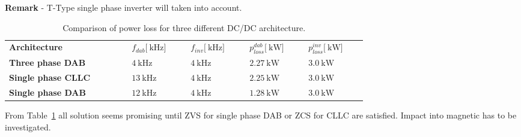 \documentclass[12pt,a4paper]{scrartcl}
\begin{document}
\begin{onehalfspace}
\noindent\textbf{Remark} - T-Type single phase inverter will taken into account.
\begin{center}	
	\doublespacing
	\begin{longtable}{p{0.25\linewidth}|p{0.125\linewidth}|p{0.125\linewidth}|p{0.125\linewidth}|p{0.125\linewidth}}
		\captionsetup{width=0.65\textwidth, font=small}
		\caption{Comparison of power loss for three different DC/DC architecture.}
		\label{summary_results_table_1} \\
		\hline\hline
		\textbf{Architecture} & \hspace*{\fill} $f_{dab}\big[\SI{}{\kilo\hertz}\big]$  & \hspace*{\fill} $f_{inv}\big[\SI{}{\kilo\hertz}\big]$ & \hspace*{\fill} $p_{loss}^{dab}\big[\SI{}{\kilo\watt}\big]$  & \hspace*{\fill} $p_{loss}^{inv}\big[\SI{}{\kilo\watt}\big]$ \\
		\hline
		\textbf{Three phase DAB} & \hspace*{\fill} $\SI{4}{\kilo\hertz}$ & \hspace*{\fill} $\SI{4}{\kilo\hertz}$  & \hspace*{\fill} $\SI{2.27 }{\kilo\watt}$  & \hspace*{\fill} $\SI{3.0}{\kilo\watt}$  \\
		\hline
		\textbf{Single phase CLLC} & \hspace*{\fill} $\SI{13}{\kilo\hertz}$  & \hspace*{\fill} $\SI{4}{\kilo\hertz}$ & \hspace*{\fill} $\SI{2.25}{\kilo\watt}$  & \hspace*{\fill} $\SI{3.0}{\kilo\watt}$  \\
		\hline
		\textbf{Single phase DAB} & \hspace*{\fill} $\SI{12}{\kilo\hertz}$  & \hspace*{\fill} $\SI{4}{\kilo\hertz}$ & \hspace*{\fill} $\SI{1.28}{\kilo\watt}$  & \hspace*{\fill} $\SI{3.0}{\kilo\watt}$ \\
		\hline\hline
	\end{longtable}
\end{center}

From Table~\ref{summary_results_table_1} all solution seems promising until ZVS for single phase DAB or ZCS for CLLC are  satisfied. Impact into magnetic has to be investigated. 


\end{onehalfspace}
\end{document}

